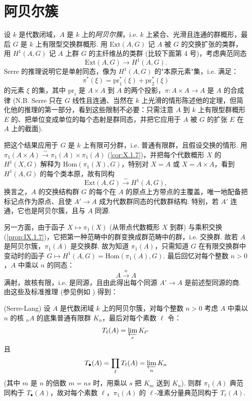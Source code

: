 \section{阿贝尔簇}

设 $k$ 是代数闭域，$A$ 是 $k$ 上的\emph{阿贝尔簇}，i.e. $k$ 上紧合、光滑且连通的群概形，最后 $G$ 是 $k$ 上有限型交换群概形. 用 $\mathrm{Ext}(A, G)$ 记 $A$ 被 $G$ 的交换扩张的类群，用 $H^1(A, G)$ 记 $A$ 上群 $G$ 的主纤维丛的类群 (比较下面第 4 号)，考虑典范同态
\[
\mathrm{Ext}(A, G) \longrightarrow H^1(A, G).
\]
Serre \cite[第七章，定理 5]{exp11-5} 的推理说明它是单射同态，像为 $H^1(A, G)$ 的"本原元素"集，i.e. 满足：
\[
\pi^{*}(\xi) = \mathrm{pr}_1^{*}(\xi) + \mathrm{pr}_2^{*}(\xi)
\]
的元素 $\xi$ 的集，其中 $\mathrm{pr}_i$ 是 $A \times A$ 到 $A$ 的两个投影，$\pi \colon A \times A \to A$ 是 $A$ 的合成律 (N.B. Serre 只在 $G$ 线性且连通、当然在 $k$ 上光滑的情形陈述他的定理，但简化他的推理的第一部分，看到这些限制不必要：只需注意 $A$ 到 $k$ 上有限型群概形 $E$ 的、把单位变成单位的每个态射是群同态，并把它应用于 $A$ 被 $G$ 的扩张 $E$ 在 $A$ 上的截面).

把这个结果应用于 $G$ 是 $k$ 上有限可分群，i.e. 普通有限群，且假设交换的情形. 用 $\pi_1(A \times A) \xrightarrow{\sim} \pi_1(A) \times \pi_1(A)$ (\cref{cor:X.1.7})，并把每个代数概形 $X$ 的 $H^1(X, G)$ 解释为 $\mathrm{Hom}(\pi_1(X), G)$，特别对 $X = A$ 或 $X = A \times A$，看到 $H^1(A, G)$ 的每个类本原，故有同构
\[
\mathrm{Ext}(A, G) \xrightarrow{\sim} H^1(A, G),
\]
换言之，$A$ 的交换结构群 $G$ 的每个在 $A$ 的原点上方带点的主覆盖，唯一地配备把标记点作为原点、且使 $A' \to A$ 成为代数群同态的代数群结构. 特别，若 $A'$ 连通，它也是阿贝尔簇，且与 $A$ 同源.

另一方面，由于函子 $X \mapsto \pi_1(X)$ (从带点代数概形 $X$ 到群) 与乘积交换 (\cref{prop:IX.1.7})，它把第一种范畴中的群变换成群范畴中的群，i.e. 交换群. 故若 $A$ 是阿贝尔簇，$\pi_1(A)$ 是交换群. 故为知道 $\pi_1(A)$，只需知道 $G$ 在有限交换群中变动时的函子 $G \mapsto H^1(A, G) = \mathrm{Hom}(\pi_1(A), G)$. 最后回忆对每个整数 $n > 0$，$A$ 中乘以 $n$ 的同态：
\[
A \xrightarrow{n} A
\]
满射，故核有限，i.e. 是同源，且由此得出每个同源 $A' \to A$ 是前述型同源的商. 由这些及标准推理 (参见例如 \cite{exp11-6}) 得到：

\begin{theorem}\label{thm:XI.2.1}
(Serre-Lang) 设 $A$ 是代数闭域 $k$ 上的阿贝尔簇，对每个整数 $n > 0$ 考虑 $A$ 中乘以 $n$ 的核 ${}_n A$ 的底集普通有限群 $K_n$，最后对每个素数 $\ell$ 令：
\[
T_\ell(A) = \varprojlim_r K_{\ell^r}
\]
且
\[
T_\bullet(A) = \prod_\ell T_\ell(A) = \varprojlim_n K_n
\]
(其中 $m$ 是 $n$ 的倍数 $m = ns$ 时，用乘以 $s$ 把 $K_m$ 送到 $K_n$). 则群 $\pi_1(A)$ 典范同构于 $T_\bullet(A)$，故对每个素数 $\ell$，$\pi_1(A)$ 的 $\ell$-准素分量典范同构于 $T_\ell(A)$.
\end{theorem}


